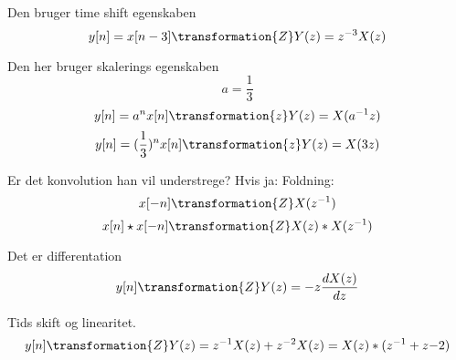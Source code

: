 \begin{Opgaver}
\begin{kapitel}[Z transformation]
        \begin{Opgave}
            \begin{UnderOpgave}[\text{$y[n] = x[n - 3]$}]
                Den bruger time shift egenskaben
                \[y[n] = x[n - 3] \transformation{Z} Y(z) = z^{-3}X(z) \]

            \end{UnderOpgave}

            \begin{UnderOpgave}[\text{$y[n] = (\frac{1}{3})^n * x[n]$}]
                Den her bruger skalerings egenskaben
                \[a = \frac{1}{3}\]
                \[y[n] = a^nx[n] \transformation{z} Y(z) = X(a^{-1}z)\]
                \[y[n] = (\frac{1}{3})^nx[n] \transformation{z} Y(z) = X(3z)\]
            \end{UnderOpgave}

            \begin{UnderOpgave}[\text{y[n] = x[n]*x[-n]}]
                Er det konvolution han vil understrege? Hvis ja: 
                Foldning: 
                \[x[-n] \transformation{Z} X(z^{-1})\]
                \[x[n]\star x[-n] \transformation{Z} X(z)*X(z^{-1})\]
            \end{UnderOpgave}

            \begin{UnderOpgave}[\text{y[n] = n*x[-n]}]
                Det er differentation
                \[y[n] \transformation{Z} Y(z) = -z\frac{dX(z)}{dz}\]
            \end{UnderOpgave}

            \begin{UnderOpgave}[\text{y[n] = x[n-1] + x[n + 2]}]
                Tids skift og linearitet. 
                \[y[n] \transformation{Z} Y(z) = z^{-1}X(z) + z^{-2}X(z) = X(z)*(z^{-1} + z{-2}) \]     
            \end{UnderOpgave}


\end{Opgave}
\end{kapitel}
\end{Opgaver}
